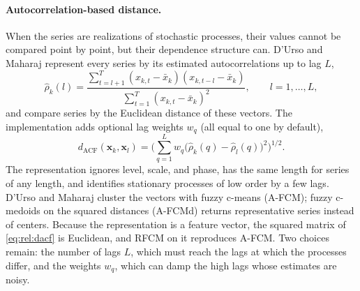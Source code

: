 \paragraph{Autocorrelation-based distance.} When the series are realizations of stochastic processes, their values cannot be compared point by point, but their dependence structure can. D'Urso and Maharaj \cite{durso:2009:autocorrelation} represent every series by its estimated autocorrelations up to lag $L$,
\begin{equation}
  \hat\rho_k(l)=\frac{\sum_{t=l+1}^{T}(x_{k,t}-\bar x_k)(x_{k,t-l}-\bar x_k)}{\sum_{t=1}^{T}(x_{k,t}-\bar x_k)^2},\qquad l=1,\dots,L,
  \label{eq:rel:acf}
\end{equation}
and compare series by the Euclidean distance of these vectors. The implementation adds optional lag weights $w_q$ (all equal to one by default),
\begin{equation}
  d_{\mathrm{ACF}}(\mathbf{x}_k,\mathbf{x}_l)=\Big(\sum_{q=1}^{L}w_q\big(\hat\rho_k(q)-\hat\rho_l(q)\big)^2\Big)^{1/2}.
  \label{eq:rel:dacf}
\end{equation}
The representation ignores level, scale, and phase, has the same length for series of any length, and identifies stationary processes of low order by a few lags. D'Urso and Maharaj cluster the vectors with fuzzy c-means (A-FCM); fuzzy c-medoids on the squared distances (A-FCMd) returns representative series instead of centers. Because the representation is a feature vector, the squared matrix of \eqref{eq:rel:dacf} is Euclidean, and RFCM on it reproduces A-FCM. Two choices remain: the number of lags $L$, which must reach the lags at which the processes differ, and the weights $w_q$, which can damp the high lags whose estimates are noisy.

